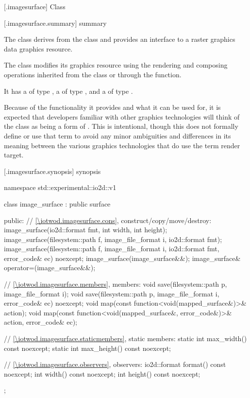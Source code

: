  [\iotwod.imagesurface] {Class }

 [\iotwod.imagesurface.summary] { summary}

\pnum
{}%
The class  derives from the  class and provides an interface to a raster graphics data graphics resource.

\pnum
The  class modifies its graphics resource using the rendering and composing operations inherited from the  class or through the  function.

\pnum
It has a  of type , a  of type , and a  of type .

\pnum
\begin{note}
Because of the functionality it provides and what it can be used for, it is expected that developers familiar with other graphics technologies will think of the  class as being a form of . This is intentional, though this \documenttypename{} does not formally define or use that term to avoid any minor ambiguities and differences in its meaning between the various graphics technologies that do use the term render target.
\end{note}

 [\iotwod.imagesurface.synopsis] { synopsis}

\begin{codeblock}
namespace std::experimental::io2d::v1 {
  class image_surface : public surface {
  public:
    // \ref{\iotwod.imagesurface.cons}, construct/copy/move/destroy:
    image_surface(io2d::format fmt, int width, int height);
    image_surface(filesystem::path f, image_file_format i, 
      io2d::format fmt);
    image_surface(filesystem::path f, image_file_format i, 
      io2d::format fmt, error_code& ec) noexcept;
    image_surface(image_surface&&);
    image_surface& operator=(image_surface&&);
    
    // \ref{\iotwod.imagesurface.members}, members:
    void save(filesystem::path p, image_file_format i);
    void save(filesystem::path p, image_file_format i, error_code& ec) noexcept;
    void map(const function<void(mapped_surface&)>& action);
    void map(const function<void(mapped_surface&, error_code&)>& action,
      error_code& ec);
    
    // \ref{\iotwod.imagesurface.staticmembers}, static members:
    static int max_width() const noexcept;
    static int max_height() const noexcept;
    
    // \ref{\iotwod.imagesurface.observers}, observers:
    io2d::format format() const noexcept;
    int width() const noexcept;
    int height() const noexcept;
  };
}
\end{codeblock}

